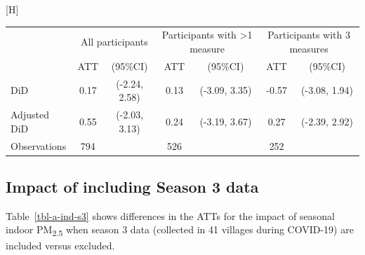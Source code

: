 \documentclass[
  letterpaper,
  DIV=11,
  numbers=noendperiod]{scrartcl}
\makeatletter
\renewenvironment{table}%
  {\renewcommand\familydefault\sfdefault
   \@float{table}}
  {\end@float}
\makeatother
\begin{document}
\hypertarget{tbl-a-feno}{}
\begin{table}[H]
\caption{\label{tbl-a-feno}Effects of the CBHP policy on FeNO (ppb) based on the number of
individuals with repeated measurements. }\tabularnewline

\centering
\begin{tabular}{lcccccc}
\toprule
\multicolumn{1}{c}{ } & \multicolumn{2}{c}{All participants} & \multicolumn{2}{c}{Participants with >1 measure} & \multicolumn{2}{c}{Participants with 3 measures} \\
\cmidrule(l{3pt}r{3pt}){2-3} \cmidrule(l{3pt}r{3pt}){4-5} \cmidrule(l{3pt}r{3pt}){6-7}
 & ATT & (95\%CI) & ATT & (95\%CI) & ATT & (95\%CI)\\
\midrule
DiD & 0.17 & (-2.24, 2.58) & 0.13 & (-3.09, 3.35) & -0.57 & (-3.08, 1.94)\\
Adjusted DiD & 0.55 & (-2.03, 3.13) & 0.24 & (-3.19, 3.67) & 0.27 & (-2.39, 2.92)\\
Observations & 794 &  & 526 &  & 252 & \\
\bottomrule
\end{tabular}
\end{table}

\newpage

\hypertarget{impact-of-including-season-3-data}{%
\subsection{Impact of including Season 3
data}\label{impact-of-including-season-3-data}}

Table~\ref{tbl-a-ind-s3} shows differences in the ATTs for the impact of
seasonal indoor PM\textsubscript{2.5} when season 3 data (collected in
41 villages during COVID-19) are included versus excluded.
\end{document}
